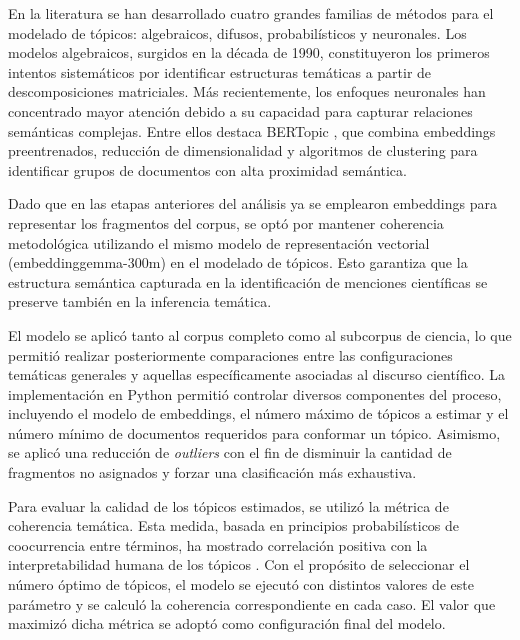 \documentclass[11pt,a4paper]{article}
\begin{document}
	En la literatura se han desarrollado cuatro grandes familias de métodos para el modelado de tópicos: algebraicos, difusos, probabilísticos y neuronales. Los modelos algebraicos, surgidos en la década de 1990, constituyeron los primeros intentos sistemáticos por identificar estructuras temáticas a partir de descomposiciones matriciales. Más recientemente, los enfoques neuronales han concentrado mayor atención debido a su capacidad para capturar relaciones semánticas complejas. Entre ellos destaca BERTopic \cite{Grootendorst2022}, que combina embeddings preentrenados, reducción de dimensionalidad y algoritmos de clustering para identificar grupos de documentos con alta proximidad semántica.
	
	Dado que en las etapas anteriores del análisis ya se emplearon embeddings para representar los fragmentos del corpus, se optó por mantener coherencia metodológica utilizando el mismo modelo de representación vectorial (embeddinggemma-300m) en el modelado de tópicos. Esto garantiza que la estructura semántica capturada en la identificación de menciones científicas se preserve también en la inferencia temática.
	
	El modelo se aplicó tanto al corpus completo como al subcorpus de ciencia, lo que permitió realizar posteriormente comparaciones entre las configuraciones temáticas generales y aquellas específicamente asociadas al discurso científico. La implementación en Python permitió controlar diversos componentes del proceso, incluyendo el modelo de embeddings, el número máximo de tópicos a estimar y el número mínimo de documentos requeridos para conformar un tópico. Asimismo, se aplicó una reducción de \emph{outliers} con el fin de disminuir la cantidad de fragmentos no asignados y forzar una clasificación más exhaustiva.
	
	Para evaluar la calidad de los tópicos estimados, se utilizó la métrica de coherencia temática. Esta medida, basada en principios probabilísticos de coocurrencia entre términos, ha mostrado correlación positiva con la interpretabilidad humana de los tópicos \cite{Rder2015}. Con el propósito de seleccionar el número óptimo de tópicos, el modelo se ejecutó con distintos valores de este parámetro y se calculó la coherencia correspondiente en cada caso. El valor que maximizó dicha métrica se adoptó como configuración final del modelo.
\end{document}
